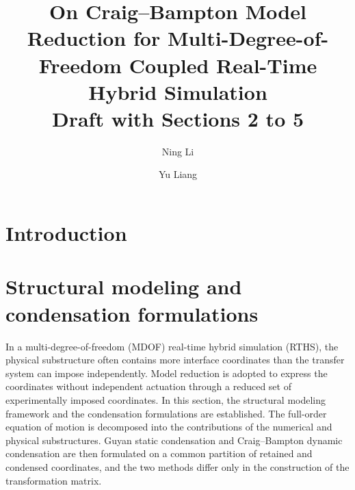 \documentclass[a4paper,fleqn,review,12pt]{cas-sc}
\numberwithin{equation}{section}
\begin{document}
\let\WriteBookmarks\relax
\def\floatpagepagefraction{1}
\def\textpagefraction{.001}

\title[mode=title]{\texorpdfstring{On Craig--Bampton Model Reduction for Multi-Degree-of-Freedom Coupled Real-Time Hybrid Simulation\\[4pt]
\large Draft with Sections 2 to 5}{On Craig--Bampton Model Reduction for Multi-Degree-of-Freedom Coupled Real-Time Hybrid Simulation - Draft with Sections 2 to 5}}

\author{Ning Li}
\author{Yu Liang}

\begin{abstract}
\mbox{} %
\end{abstract}

\shorttitle{\mbox{}}

\maketitle
\linenumbers

\section{Introduction} \label{sec1}



\section{Structural modeling and condensation formulations} \label{sec2}

In a multi-degree-of-freedom (MDOF) real-time hybrid simulation (RTHS), the physical substructure often contains more interface coordinates than the transfer system can impose independently. Model reduction is adopted to express the coordinates without independent actuation through a reduced set of experimentally imposed coordinates.
In this section, the structural modeling framework and the condensation formulations are established. The full-order equation of motion is decomposed into the contributions of the numerical and physical substructures. Guyan static condensation and Craig--Bampton dynamic condensation are then formulated on a common partition of retained and condensed coordinates, and the two methods differ only in the construction of the transformation matrix.
\end{document}
